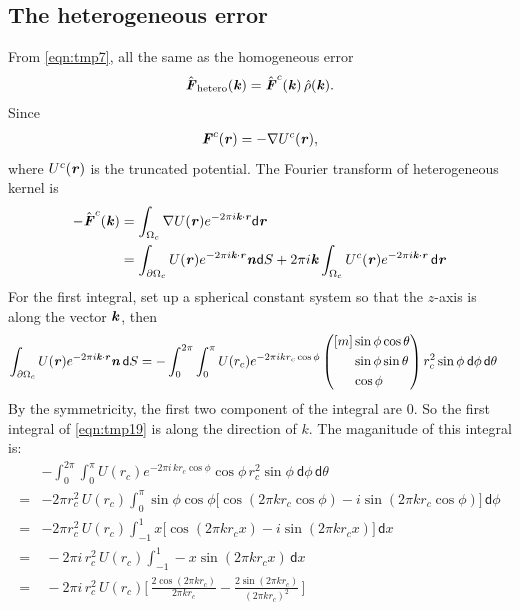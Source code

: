 \documentclass[aps,pre,preprint]{revtex4}
\renewcommand{\v}[1]{\textbf{\textit{#1}}}
\renewcommand{\d}[1]{\textsf{#1}}
\begin{document}
\subsection{The heterogeneous error}
From \eqref{eqn:tmp7},
all the same as the homogeneous error
\begin{align}
  \hat{\v F}_{\textrm{hetero}}(\v k) = \hat{\v F}^c(\v k)\,\hat\rho(\v k).
\end{align}
Since
\begin{align}
  \v F^c(\v r) = - \nabla U^c(\v r),
\end{align}
where $U^c(\v r)$ is the truncated potential. The Fourier transform of
heterogeneous kernel is
\begin{align}\nonumber
  -\hat{\v F}^c(\v k) 
  & =
  \int_{\Omega_c}\nabla U(\v r) e^{-2\pi i\v k\cdot\v r}\d d\v r \\ \label{eqn:tmp19}
  & =
  \int_{\partial\Omega_c}U(\v r) e^{-2\pi i\v k\cdot\v r} \v n\d dS
  + 2\pi i \v k\int_{\Omega_c} U^c(\v r) e^{-2\pi i\v k\cdot\v r}\,\d d\v r
\end{align}
For the first integral, set up a spherical constant system so that the
$z$-axis is along the vector $\v k$, then
\begin{align}
  \int_{\partial\Omega_c}U(\v r) e^{-2\pi i\v k\cdot\v r} \v n\,\d dS
  & =
  - \int_0^{2\pi}\int_0^{\pi}
  U(r_c) e^{-2\pi i k r_c\cos\phi}
\left(
\begin{aligned}[m]
  &\sin\phi\cos\theta\\
  &\sin\phi\sin\theta\\
  &\cos\phi
\end{aligned}
\right)
r_c^2\sin\phi\:
\d d\phi\,
\d d\theta
\end{align}
By the symmetricity, the first two component of the integral are 0. So
the first integral of \eqref{eqn:tmp19} is along the direction of
$k$. The maganitude of this integral is:
\begin{align}\nonumber
  &- \int_0^{2\pi}\int_0^{\pi}
  U(r_c) e^{-2\pi i\, k r_c\cos\phi}
  \cos\phi\,
  r_c^2\sin\phi\:
  \d d\phi\,
  \d d\theta\\\nonumber
  = &
  -2\pi r_c^2\,U(r_c)
  \int_0^\pi\sin\phi\cos\phi
  \big[\cos(2\pi kr_c\cos\phi) - i\sin(2\pi kr_c\cos\phi)\big]
  \,\d d\phi \\\nonumber
  = &
  -2\pi r_c^2\,U(r_c)
  \int_{-1}^1 x \big[\cos(2\pi kr_cx) - i\sin(2\pi kr_cx)\big]
  \,\d dx \\ \nonumber
  = &\;
  -2\pi i\, r_c^2\,U(r_c)
  \int_{-1}^1 -x\sin(2\pi kr_cx)
  \,\d dx \\ 
  = &\;
  -2\pi i\, r_c^2\,U(r_c)
  \bigg[\,
  \frac{2\cos(2\pi kr_c)}{2\pi kr_c}
  -\frac{2\sin(2\pi kr_c)}{(2\pi kr_c)^2}
  \,\bigg]
\end{align}
\end{document}
